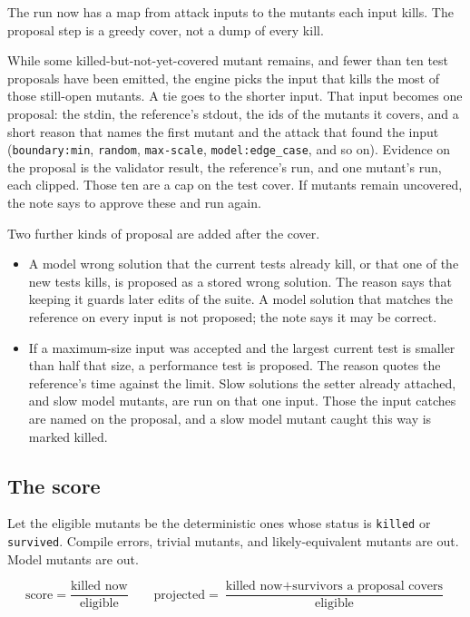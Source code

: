 \documentclass[10pt,a4paper]{article}
\begin{document}
The run now has a map from attack inputs to the mutants each input kills. The proposal step is a greedy cover, not a dump of every kill.

While some killed-but-not-yet-covered mutant remains, and fewer than ten test proposals have been emitted, the engine picks the input that kills the most of those still-open mutants. A tie goes to the shorter input. That input becomes one proposal: the stdin, the reference's stdout, the ids of the mutants it covers, and a short reason that names the first mutant and the attack that found the input (\texttt{boundary:min}, \texttt{random}, \texttt{max-scale}, \texttt{model:edge\_case}, and so on). Evidence on the proposal is the validator result, the reference's run, and one mutant's run, each clipped. Those ten are a cap on the test cover. If mutants remain uncovered, the note says to approve these and run again.

Two further kinds of proposal are added after the cover.

\begin{itemize}
  \item A model wrong solution that the current tests already kill, or that one of the new tests kills, is proposed as a stored wrong solution. The reason says that keeping it guards later edits of the suite. A model solution that matches the reference on every input is not proposed; the note says it may be correct.
  \item If a maximum-size input was accepted and the largest current test is smaller than half that size, a performance test is proposed. The reason quotes the reference's time against the limit. Slow solutions the setter already attached, and slow model mutants, are run on that one input. Those the input catches are named on the proposal, and a slow model mutant caught this way is marked killed.
\end{itemize}

\subsection{The score}

Let the eligible mutants be the deterministic ones whose status is \texttt{killed} or \texttt{survived}. Compile errors, trivial mutants, and likely-equivalent mutants are out. Model mutants are out.

\[
\text{score} = \frac{\text{killed now}}{\text{eligible}}
\qquad
\text{projected} = \frac{\text{killed now} + \text{survivors a proposal covers}}{\text{eligible}}
\]
\end{document}
